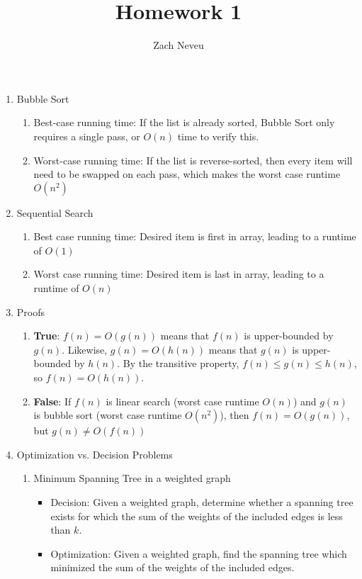 \documentclass[12pt, letter]{article}
\author{Zach Neveu}
\title{ Homework 1 }
\begin{document}
\maketitle
\thispagestyle{fancy}

\begin{enumerate}
	\item Bubble Sort
	\begin{enumerate}
		\item Best-case running time: If the list is already sorted, Bubble Sort only requires a single pass, or $O(n)$ time to verify this.
		\item Worst-case running time: If the list is reverse-sorted, then every item will need to be swapped on each pass, which makes the worst case runtime $O(n^2)$
	\end{enumerate}
	\item Sequential Search
	\begin{enumerate}
		\item Best case running time: Desired item is first in array, leading to a runtime of $O(1)$
		\item Worst case running time: Desired item is last in array, leading to a runtime of $O(n)$
	\end{enumerate}
	\item Proofs
	\begin{enumerate}
		\item \textbf{True}: $f(n) = O(g(n))$ means that $f(n)$ is upper-bounded by $g(n)$. Likewise, $g(n) = O(h(n))$ means that $g(n)$ is upper-bounded by $h(n)$. By the transitive property, $f(n) \le g(n) \le h(n)$, so $f(n) = O(h(n))$.
		\item \textbf{False}: If $f(n)$ is linear search (worst case runtime $O(n)$) and $g(n)$ is bubble sort (worst case runtime $O(n^2)$), then $f(n) = O(g(n))$, but $g(n) \ne O(f(n))$
	\end{enumerate}
	\item Optimization vs. Decision Problems
	\begin{enumerate}
		\item Minimum Spanning Tree in a weighted graph
		\begin{itemize}
			\item Decision: Given a weighted graph, determine whether a spanning tree exists for which the sum of the weights of the included edges is less than $k$.
			\item Optimization: Given a weighted graph, find the spanning tree which minimized the sum of the weights of the included edges.

\end{itemize}
\end{enumerate}
\end{enumerate}
\end{document}
